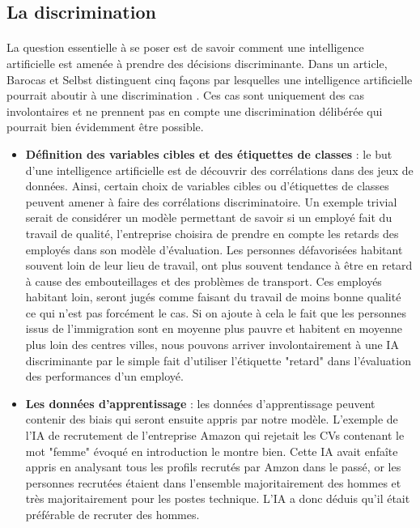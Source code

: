 \subsection{La discrimination}
\paragraph{}La question essentielle à se poser est de savoir comment une intelligence artificielle est amenée à prendre des décisions discriminante. Dans un article, Barocas et Selbst distinguent cinq façons par lesquelles une intelligence artificielle pourrait aboutir à une discrimination \cite{discriminationWay}. Ces cas sont uniquement des cas involontaires et ne prennent pas en compte une discrimination délibérée qui pourrait bien évidemment être possible.
\begin{itemize}
    \item \textbf{Définition des variables cibles et des étiquettes de classes} : le but d'une intelligence artificielle est de découvrir des corrélations dans des jeux de données. Ainsi, certain choix de variables cibles ou d'étiquettes de classes peuvent amener à faire des corrélations discriminatoire. Un exemple trivial serait de considérer un modèle permettant de savoir si un employé fait du travail de qualité, l'entreprise choisira de prendre en compte les retards des employés dans son modèle d'évaluation. Les personnes défavorisées habitant souvent loin de leur lieu de travail, ont plus souvent tendance à être en retard à cause des embouteillages et des problèmes de transport. Ces employés habitant loin, seront jugés comme faisant du travail de moins bonne qualité ce qui n'est pas forcément le cas. Si on ajoute à cela le fait que les personnes issus de l'immigration sont en moyenne plus pauvre et habitent en moyenne plus loin des centres villes, nous pouvons arriver involontairement à une IA discriminante par le simple fait d'utiliser l'étiquette "retard" dans l'évaluation des performances d'un employé.
    \item \textbf{Les données d'apprentissage} : les données d'apprentissage peuvent contenir des biais qui seront ensuite appris par notre modèle. L'exemple de l'IA de recrutement de l'entreprise Amazon qui rejetait les CVs contenant le mot "femme"\cite{amazonAi} évoqué en introduction le montre bien. Cette IA avait enfaîte appris en analysant tous les profils recrutés par Amzon dans le passé, or les personnes recrutées étaient dans l'ensemble majoritairement des hommes et très majoritairement pour les postes technique. L'IA a donc déduis qu'il était préférable de recruter des hommes.

\end{itemize}

